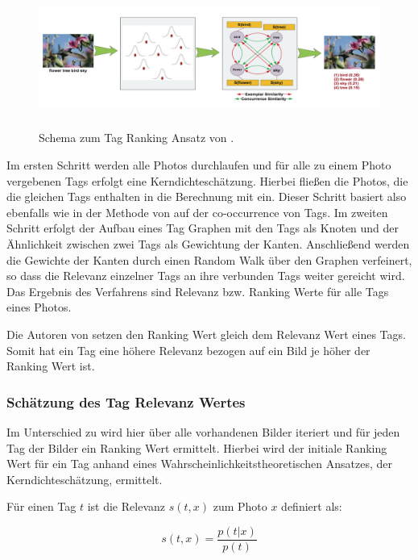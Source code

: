 \begin{figure}[htbp]
  \centering
    \includegraphics[height=1.8in]{images/tag_ranking_verfahren.png}
  \caption{Schema zum Tag Ranking Ansatz von \cite{ranking}.}
  \label{fig:images_tag_ranking_verfahren}
\end{figure}

Im ersten Schritt werden alle Photos durchlaufen und für alle zu einem Photo vergebenen Tags erfolgt eine Kerndichteschätzung. Hierbei fließen die Photos, die die gleichen Tags enthalten in die Berechnung mit ein. Dieser Schritt basiert also ebenfalls wie in der Methode von \cite{collectiveKnowledge} auf der co-occurrence von Tags. Im zweiten Schritt erfolgt der Aufbau eines Tag Graphen mit den Tags als Knoten und der Ähnlichkeit zwischen zwei Tags als Gewichtung der Kanten. Anschließend werden die Gewichte der Kanten durch einen Random Walk über den Graphen verfeinert, so dass die Relevanz einzelner Tags an ihre verbunden Tags weiter gereicht wird. Das Ergebnis des Verfahrens sind Relevanz bzw. Ranking Werte für alle Tags eines Photos.

Die Autoren von \cite{ranking} setzen den Ranking Wert gleich dem Relevanz Wert eines Tags. Somit hat ein Tag eine höhere Relevanz bezogen auf ein Bild je höher der Ranking Wert ist.

\subsubsection{Schätzung des Tag Relevanz Wertes} %
\label{ssub:schaetzung_des_tag_relevanz_wertes}

Im Unterschied zu \cite{collectiveKnowledge} wird hier über alle vorhandenen Bilder iteriert und für jeden Tag der Bilder ein Ranking Wert ermittelt. Hierbei wird der initiale Ranking Wert für ein Tag anhand eines Wahrscheinlichkeitstheoretischen Ansatzes, der Kerndichteschätzung, ermittelt.
 
Für einen Tag $t$ ist die Relevanz $s(t, x)$ zum Photo $x$ definiert als:
 \begin{figure}[hptb]
  \begin{equation}
  \label{fig:initialAsyncTagRelevance}
   s(t, x) = \frac{p(t \vert x)}{ p(t) }
  \end{equation}
 \end{figure}
 
